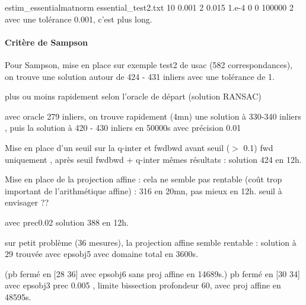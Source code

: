 \documentclass{article}
\begin{document}
estim_essentialmatnorm essential_test2.txt 10 0.001 2 0.015 1.e-4 0 0 100000 2 
avec une tol\'erance 0.001, c'est plus long.


\paragraph{Crit\`ere de Sampson}

Pour Sampson, mise en place 
sur exemple test2 de usac (582 correspondances),  on trouve une solution autour de 424 - 431  inliers  avec une tol\'erance de 1.

plus ou moins rapidement selon l'oracle de d\'epart  (solution RANSAC)

avec oracle 279 inliers, on trouve rapidement (4mn) une solution \`a 330-340 inliers , puis la solution \`a 420 - 430 inliers en 50000s
avec pr\'ecision 0.01

Mise en place d'un seuil sur la q-inter et fwdbwd
avant seuil ($>$ 0.1)  fwd uniquement , apr\`es seuil  fwdbwd + q-inter
m\^emes r\'esultats : solution 424 en 12h.


Mise en place de la projection affine : cela ne semble pas rentable (co\^ut trop important  de l'arithm\'etique affine)  : 316 en 20mn,
pas mieux en 12h. seuil \`a envisager ??








avec prec0.02  solution 388 en 12h.




sur petit problème (36 mesures), la projection affine semble rentable :  solution à 29 trouvée avec epsobj5 avec domaine total en 3600s.

(pb fermé en [28 36] avec epsobj6  sans proj affine en 14689s.)
pb fermé en [30 34] avec epsobj3  prec 0.005 , limite bissection profondeur 60, avec proj affine en 48595s.
\end{document}
